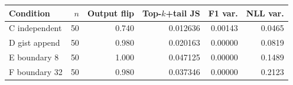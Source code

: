 \begin{tabular}{lrrrrr}
\toprule
Condition & $n$ & Output flip & Top-$k$+tail JS & F1 var. & NLL var. \\
\midrule
C independent & 50 & 0.740 & 0.012636 & 0.00143 & 0.0465 \\
D gist append & 50 & 0.980 & 0.020163 & 0.00000 & 0.0819 \\
E boundary 8 & 50 & 1.000 & 0.047125 & 0.00000 & 0.1489 \\
F boundary 32 & 50 & 0.980 & 0.037346 & 0.00000 & 0.2123 \\
\bottomrule
\end{tabular}
